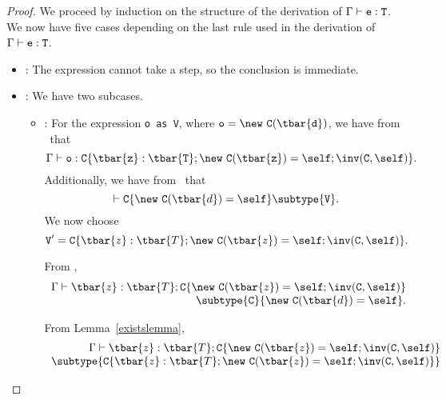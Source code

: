 \begin{proof}
We proceed by induction on the
structure of the derivation of $\Gamma \vdash {\tt e}: {\tt T}$.  We now have five
cases depending on the last rule used in the derivation
of $\Gamma \vdash {\tt e}: {\tt T}$.
\begin{itemize}
\item
\TVar: The expression cannot take a step, so the conclusion is immediate.
\item
\TCast: We have two subcases.
   \begin{itemize}
   \item
   \RCast:  For the expression {\tt o~as~V}, where 
            ${\tt o} = {\tt \new\ {\tt C(\tbar{d})}}$,
            we have from \TNew\ that 
            $$\Gamma \vdash {\tt o: {\tt C}\{\tbar{z}: \tbar{T}; \new\ {\tt C}(\tbar{z}) = \self; \inv({\tt C},\self)\}}.$$
            Additionally, we have from \RCast\ that 
            $$\vdash {\tt C}\{\new\ {\tt C}(\tbar{d}) = \self\} \subtype {\tt V}.$$
            We now choose 
            $${\tt V}' = {{\tt C}\{\tbar{z}: \tbar{T}; \new\ {\tt C}(\tbar{z}) = \self; \inv({\tt C},\self)\}}.$$

            From ,
            $$
            \begin{array}{r}
            \Gamma \vdash \tbar{z}: \tbar{T}; {{\tt C}\{\new\ {\tt C}(\tbar{z}) = \self; \inv({\tt C},\self)\}} \\
            \subtype {\tt C}\{\new\ {\tt C}(\tbar{d}) = \self\}.
            \end{array}
            $$

            From Lemma~\ref{existslemma},
            $$
            \begin{array}{r}
            \Gamma \vdash
            \tbar{z}: \tbar{T}; {{\tt C}\{\new\ {\tt C}(\tbar{z}) = \self; \inv({\tt C},\self)\}} \\
            \subtype
                {{\tt C}\{\tbar{z}: \tbar{T}; \new\ {\tt C}(\tbar{z}) = \self; \inv({\tt C},\self)\}}
            \end{array}
            $$


\end{itemize}
\end{itemize}
\end{proof}
